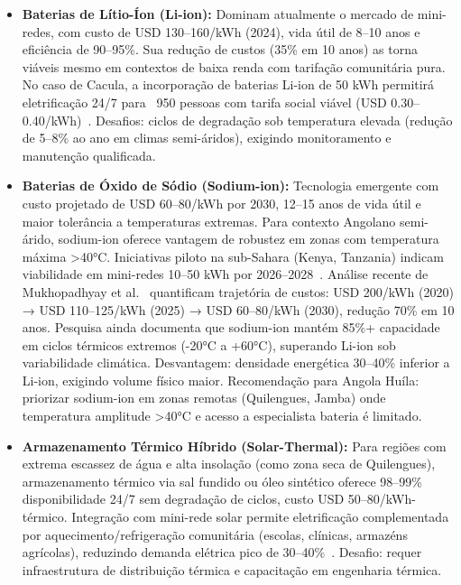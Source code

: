 \documentclass[12pt, a4paper]{article}
\begin{document}
\begin{itemize}
  \item \textbf{Baterias de Lítio-Íon (Li-ion):} Dominam atualmente o mercado de mini-redes, com custo de USD 130--160/kWh (2024), vida útil de 8--10 anos e eficiência de 90--95\%. Sua redução de custos (35\% em 10 anos) as torna viáveis mesmo em contextos de baixa renda com tarifação comunitária pura. No caso de Cacula, a incorporação de baterias Li-ion de 50 kWh permitirá eletrificação 24/7 para ~950 pessoas com tarifa social viável (USD 0.30--0.40/kWh)~\citep{Kizilcec2020}. Desafios: ciclos de degradação sob temperatura elevada (redução de 5--8\% ao ano em climas semi-áridos), exigindo monitoramento e manutenção qualificada.

  \item \textbf{Baterias de Óxido de Sódio (Sodium-ion):} Tecnologia emergente com custo projetado de USD 60--80/kWh por 2030, 12--15 anos de vida útil e maior tolerância a temperaturas extremas. Para contexto Angolano semi-árido, sodium-ion oferece vantagem de robustez em zonas com temperatura máxima >40°C. Iniciativas piloto na sub-Sahara (Kenya, Tanzania) indicam viabilidade em mini-redes 10--50 kWh por 2026--2028~\citep{Zaraket2022}. Análise recente de Mukhopadhyay et al.~\citep{Mukhopadhyay2025} quantificam trajetória de custos: USD 200/kWh (2020) → USD 110--125/kWh (2025) → USD 60--80/kWh (2030), redução 70\% em 10 anos. Pesquisa ainda documenta que sodium-ion mantém 85\%+ capacidade em ciclos térmicos extremos (-20°C a +60°C), superando Li-ion sob variabilidade climática. Desvantagem: densidade energética 30--40\% inferior a Li-ion, exigindo volume físico maior. Recomendação para Angola Huíla: priorizar sodium-ion em zonas remotas (Quilengues, Jamba) onde temperatura amplitude >40°C e acesso a especialista bateria é limitado.

  \item \textbf{Armazenamento Térmico Híbrido (Solar-Thermal):} Para regiões com extrema escassez de água e alta insolação (como zona seca de Quilengues), armazenamento térmico via sal fundido ou óleo sintético oferece 98--99\% disponibilidade 24/7 sem degradação de ciclos, custo USD 50--80/kWh-térmico. Integração com mini-rede solar permite eletrificação complementada por aquecimento/refrigeração comunitária (escolas, clínicas, armazéns agrícolas), reduzindo demanda elétrica pico de 30--40\%~\citep{Zaraket2022}. Desafio: requer infraestrutura de distribuição térmica e capacitação em engenharia térmica.
\end{itemize}
\end{document}
